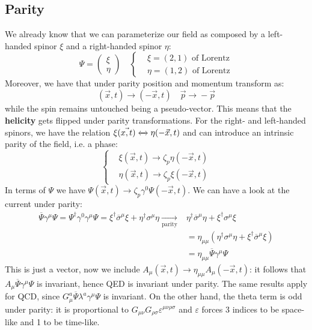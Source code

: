\documentclass[../main.tex]{subfiles}
\begin{document}
\subsection{Parity}
We already know that we can parameterize our field as composed by a left-handed spinor $\xi$ and a right-handed spinor $\eta$:
\[
\Psi=\left(\begin{array}{c}
     \xi\\
     \eta
\end{array}\right)
\quad
\left\{
\begin{aligned}
&\xi=(2,1) \text{ of Lorentz}\\
&\eta=(1,2) \text{ of Lorentz}
\end{aligned}
\right.
\]
Moreover, we have that under parity position and momentum transform as:
\[
(\Vec{x},t)\xrightarrow[]{}(-\Vec{x},t) \quad \Vec{p}\xrightarrow[]{}-\Vec{p}
\]
while the spin remains untouched being a pseudo-vector. This means that the \textbf{helicity} gets flipped under parity transformations. For the right- and left-handed spinors, we have the relation $\xi(\Vec{x,t})\xleftrightarrow[]{}\eta(-\Vec{x},t)$ and can introduce an intrinsic parity of the field, i.e. a phase:
\[
\left\{
\begin{aligned}
&\xi(\Vec{x},t)\xrightarrow[]{}\zeta_p\eta(-\Vec{x},t)\\
&\eta(\Vec{x},t)\xrightarrow[]{}\zeta_p\xi(-\Vec{x},t)
\end{aligned}
\right.
\]
In terms of $\Psi$ we have $\Psi(\Vec{x},t)\xrightarrow[]{}\zeta_p\gamma^0\Psi(-\Vec{x},t).$ We can have a look at the current under parity:
\begin{align*}
\overline{\Psi}\gamma^\mu\Psi=\Psi^\dagger\gamma^0\gamma^\mu\Psi=\xi^\dagger\overline{\sigma}^\mu\xi+\eta^\dagger\sigma^\mu\eta\xrightarrow[\text{parity}]{}&\eta^\dagger\overline{\sigma}^\mu\eta+\xi^\dagger\sigma^\mu\xi\\
&=\eta_{\mu\mu}(\eta^\dagger\sigma^\mu\eta+\xi^\dagger\overline{\sigma}^\mu\xi)\\
&=\eta_{\mu\mu}\overline{\Psi}\gamma^\mu\Psi
\end{align*}
This is just a vector, now we include $A_\mu(\Vec{x},t)\xrightarrow[]{}\eta_{\mu\mu}A_\mu(-\Vec{x},t)$: it follows that $A_\mu\overline{\Psi}\gamma^\mu\Psi$ is invariant, hence QED is invariant under parity. The same results apply for QCD, since $G_\mu^a\overline{\Psi}\lambda^a\gamma^\mu\Psi$ is invariant. On the other hand, the theta term is odd under parity: it is proportional to $G_{\mu\nu}G_{\rho\sigma}\varepsilon^{\mu\nu\rho\sigma}$ and $\varepsilon$ forces 3 indices to be space-like and 1 to be time-like.
\end{document}
